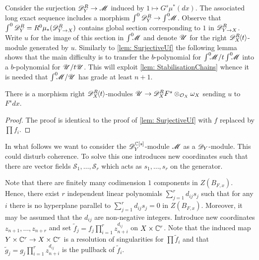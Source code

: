 Consider the surjection $\mathscr{D}_Y^R\to \mathscr{M}$ induced by $1\mapsto G^s \mu^*(dx)$.
The associated long exact sequence includes a morphism $\int^0 \mathscr{D}_Y^R \to \int^0 \mkern -8mu\mathscr{M}$.
Observe that $\int^0 \mathscr{D}_Y^R = R^0\mu_*(\mathscr{D}_{Y\to X}^R)$ contains global section corresponding to $1$ in $\mathscr{D}_{Y\to X}^R$.
Write $u$ for the image of this section in $\int^0 \mkern -8mu \mathscr{M}$ and denote $\mathscr{U}$ for the right $\mathscr{D}_X^R\mkern-5mu\left\langle t \right\rangle$-module generated by $u$.
Similarly to \cref{lem: SurjectiveUf} the following lemma shows that the main difficulty is to transfer the $b$-polynomial for $\int^0 \mkern -8mu\mathscr{M}/t\int^0 \mkern -8mu\mathscr{M}$ into a $b$-polynomial for $\mathscr{U}/t\mathscr{U}$.
This will exploit \cref{lem: StabilisationChains} whence it is needed that $\int^0 \mkern -8mu\mathscr{M} /\mathscr{U}$ has grade at least $n+1$.\\
\begin{lemma}\label{lem: SurjectionUF}
  There is a morphism right $\mathscr{D}_X^R\mkern-5mu\left\langle t \right\rangle$-modules $\mathscr{U}\to \mathscr{D}_X^RF^s \otimes_{\mathcal{O}_X}\omega_X$ sending $u$ to $F^sdx$.
\end{lemma}
\begin{proof}
   The proof is identical to the proof of \cref{lem: SurjectiveUf} with $f$ replaced by $\prod f_i$.
\end{proof}

In what follows we want to consider the $\mathscr{D}_Y^{\mathbb{C}[s]}$-module $\mathscr{M}$ as a $\mathscr{D}_Y$-module.
This could disturb coherence.
To solve this one introduces new coordinates such that there are vector fields $\mathcal{S}_1,\ldots, \mathcal{S}_r$ which acts as $s_1,\ldots,s_r$ on the generator.

Note that there are finitely many codimension $1$ components in $Z(B_{F,x})$.
Hence, there exist $r$ independent linear polynomials $\sum_{j=1}^r d_{ij}s_j$ such that for any $i$ there is no hyperplane parallel to $\sum_{j=1}^r d_{ij}s_j = 0$ in $Z(B_{F,x})$.
Moreover, it may be assumed that the $d_{ij}$ are non-negative integers.
Introduce new coordinates $z_{n+1}, \ldots,z_{n+r}$ and set $\widetilde{f}_j = f_j\prod_{i=1}^r z_{n+i}^{d_{ij}}$ on $X\times \mathbb{C}^r$.
Note that the induced map $Y\times \mathbb{C}^r \to X\times \mathbb{C}^r$ is a resolution of singularities for $\prod \widetilde{f}_i$ and that $\widetilde{g}_j = g_j\prod_{i=1}^r z_{n+i}^{d_{ij}}$ is the pullback of $\widetilde{f}_i$.

